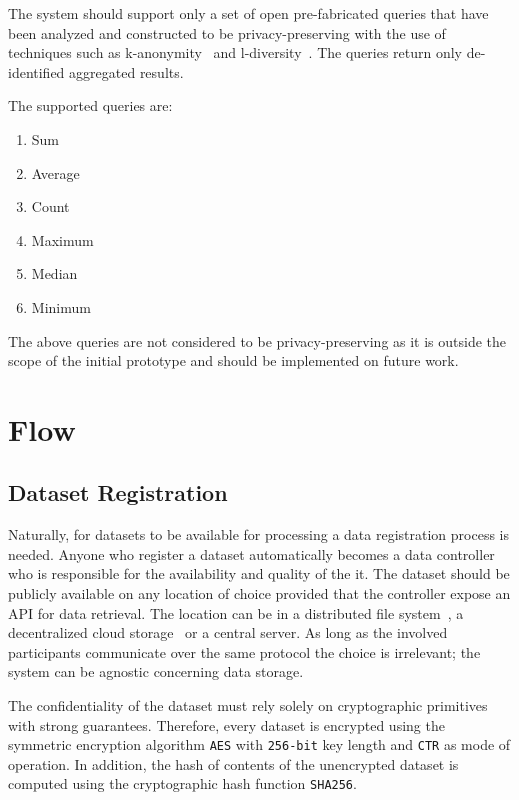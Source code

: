 The system should support only a set of open pre-fabricated queries that have been analyzed and constructed to be privacy-preserving with the use of techniques such as k-anonymity~\cite{Samarati98protectingprivacy} and l-diversity~\cite{Aggarwal2008}. The queries return only de-identified aggregated results.

The supported queries are:

\begin{enumerate}
  \item Sum
  \item Average
  \item Count
  \item Maximum
  \item Median
  \item Minimum
\end{enumerate}

The above queries are not considered to be privacy-preserving as it is outside the scope of the initial prototype and should be implemented on future work.

\section{Flow}
\label{solution:flow}

\subsection{Dataset Registration}
\label{solution:flow:reg_data}

Naturally, for datasets to be available for processing a data registration process is needed. Anyone who register a dataset automatically becomes a data controller who is responsible for the availability and quality of the it. The dataset should be publicly available on any location of choice provided that the controller expose an API for data retrieval. The location can be in a distributed file system~\cite{ipfs}, a decentralized cloud storage~\cite{storj} or a central server. As long as the involved participants communicate over the same protocol the choice is irrelevant; the system can be agnostic concerning data storage.

The confidentiality of the dataset must rely solely on cryptographic primitives with strong guarantees. Therefore, every dataset is encrypted using the symmetric encryption algorithm \verb|AES| with \verb|256-bit| key length and \verb|CTR| as mode of operation. In addition, the hash of contents of the unencrypted dataset is computed using the cryptographic hash function \verb|SHA256|.

